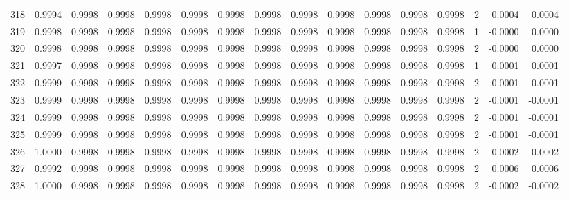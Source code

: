\begin{tabular}{lrrrrrrrrrrrrrrr}
318 &      0.9994 &  0.9998 &  0.9998 &  0.9998 &  0.9998 &  0.9998 &  0.9998 &  0.9998 &  0.9998 &  0.9998 &   0.9998 &     0.9998 &      2 &                    0.0004 &                     0.0004 \\
319 &      0.9998 &  0.9998 &  0.9998 &  0.9998 &  0.9998 &  0.9998 &  0.9998 &  0.9998 &  0.9998 &  0.9998 &   0.9998 &     0.9998 &      1 &                   -0.0000 &                     0.0000 \\
320 &      0.9998 &  0.9998 &  0.9998 &  0.9998 &  0.9998 &  0.9998 &  0.9998 &  0.9998 &  0.9998 &  0.9998 &   0.9998 &     0.9998 &      2 &                   -0.0000 &                     0.0000 \\
321 &      0.9997 &  0.9998 &  0.9998 &  0.9998 &  0.9998 &  0.9998 &  0.9998 &  0.9998 &  0.9998 &  0.9998 &   0.9998 &     0.9998 &      1 &                    0.0001 &                     0.0001 \\
322 &      0.9999 &  0.9998 &  0.9998 &  0.9998 &  0.9998 &  0.9998 &  0.9998 &  0.9998 &  0.9998 &  0.9998 &   0.9998 &     0.9998 &      2 &                   -0.0001 &                    -0.0001 \\
323 &      0.9999 &  0.9998 &  0.9998 &  0.9998 &  0.9998 &  0.9998 &  0.9998 &  0.9998 &  0.9998 &  0.9998 &   0.9998 &     0.9998 &      2 &                   -0.0001 &                    -0.0001 \\
324 &      0.9999 &  0.9998 &  0.9998 &  0.9998 &  0.9998 &  0.9998 &  0.9998 &  0.9998 &  0.9998 &  0.9998 &   0.9998 &     0.9998 &      2 &                   -0.0001 &                    -0.0001 \\
325 &      0.9999 &  0.9998 &  0.9998 &  0.9998 &  0.9998 &  0.9998 &  0.9998 &  0.9998 &  0.9998 &  0.9998 &   0.9998 &     0.9998 &      2 &                   -0.0001 &                    -0.0001 \\
326 &      1.0000 &  0.9998 &  0.9998 &  0.9998 &  0.9998 &  0.9998 &  0.9998 &  0.9998 &  0.9998 &  0.9998 &   0.9998 &     0.9998 &      2 &                   -0.0002 &                    -0.0002 \\
327 &      0.9992 &  0.9998 &  0.9998 &  0.9998 &  0.9998 &  0.9998 &  0.9998 &  0.9998 &  0.9998 &  0.9998 &   0.9998 &     0.9998 &      2 &                    0.0006 &                     0.0006 \\
328 &      1.0000 &  0.9998 &  0.9998 &  0.9998 &  0.9998 &  0.9998 &  0.9998 &  0.9998 &  0.9998 &  0.9998 &   0.9998 &     0.9998 &      2 &                   -0.0002 &                    -0.0002 \\

\end{tabular}
